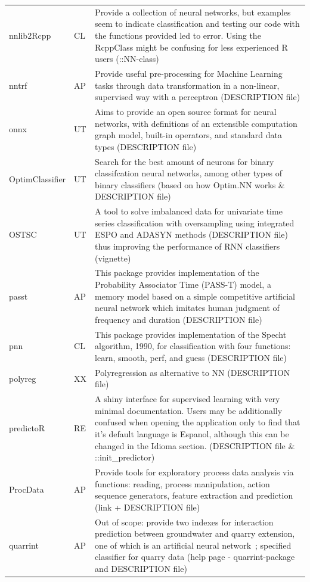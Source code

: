 \begin{Schunk}
\begin{longtable}[t]{ll>{\raggedright\arraybackslash}p{10cm}}
nnlib2Rcpp & CL & Provide a collection of neural networks, but examples seem to indicate classification and testing our code with the functions provided led to error. Using the RcppClass might be confusing for less experienced R users (::NN-class)\\
nntrf & AP & Provide useful pre-processing for Machine Learning tasks through data transformation in a non-linear, supervised way with a perceptron (DESCRIPTION file)\\
onnx & UT & Aims to provide an open source format for neural networks, with definitions of an extensible computation graph model, built-in operators, and standard data types (DESCRIPTION file)\\
\addlinespace
OptimClassifier & UT & Search for the best amount of neurons for binary classifcation neural networks, among other types of binary classifiers (based on how Optim.NN works \& DESCRIPTION file)\\
OSTSC & UT & A tool to solve imbalanced data for univariate time series classification with oversampling using integrated ESPO and ADASYN methods (DESCRIPTION file) thus improving the performance of RNN classifiers (vignette)\\
passt & AP & This package provides implementation of the Probability Associator Time (PASS-T) model, a memory model based on a simple competitive artificial neural network which imitates human judgment of frequency and duration (DESCRIPTION file)\\
pnn & CL & This package provides implementation of the Specht algorithm, 1990, for classification with four functions: learn, smooth, perf, and guess (DESCRIPTION file)\\
polyreg & XX & Polyregression as alternative to NN (DESCRIPTION file)\\
\addlinespace
predictoR & RE & A shiny interface for supervised learning with very minimal documentation. Users may be additionally confused when opening the application only to find that it's default language is Espanol, although this can be changed in the Idioma section. (DESCRIPTION file \& ::init\_predictor)\\
ProcData & AP & Provide tools for exploratory process data analysis via functions: reading, process manipulation, action sequence generators, feature extraction and prediction (link + DESCRIPTION file)\\
quarrint & AP & Out of scope: provide two indexes for interaction prediction between groundwater and quarry extension, one of which is an artificial neural network ; specified classifier for quarry data (help page - quarrint-package and DESCRIPTION file)\\

\end{longtable}
\end{Schunk}

